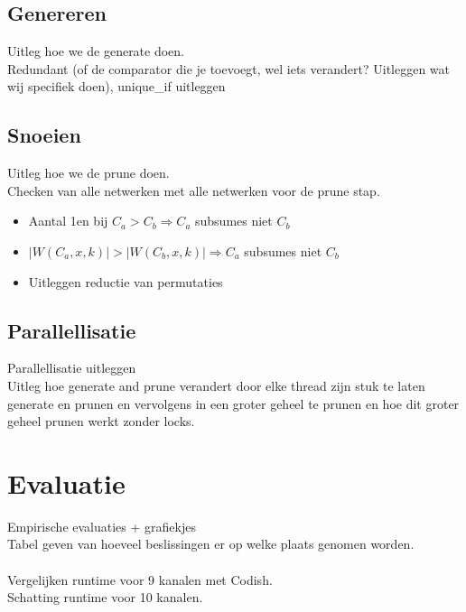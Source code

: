 \documentclass{article}
\begin{document}
\subsection{Genereren}
Uitleg hoe we de generate doen.\\
Redundant (of de comparator die je toevoegt, wel iets verandert? Uitleggen wat wij specifiek doen), unique\_if uitleggen

\subsection{Snoeien}
Uitleg hoe we de prune doen.\\
Checken  van alle netwerken met alle netwerken voor de prune stap.
\begin{itemize}
\item Aantal 1en bij $C_a > C_b \Rightarrow C_a$ subsumes niet $C_b$ 
\item $|W(C_a, x, k)| > |W(C_b, x, k)| \Rightarrow C_a$ subsumes niet $C_b$
\item Uitleggen reductie van permutaties
\end{itemize}

\subsection{Parallellisatie}
Parallellisatie uitleggen\\
Uitleg hoe generate and prune verandert door elke thread zijn stuk te laten generate en prunen en vervolgens in een groter geheel te prunen en hoe dit groter geheel prunen werkt zonder locks.


\section{Evaluatie}
Empirische evaluaties + grafiekjes\\
Tabel geven van hoeveel beslissingen er op welke plaats genomen worden.\\ \\
Vergelijken runtime voor 9 kanalen met Codish.\\
Schatting runtime voor 10 kanalen.\\\\


\end{document}
